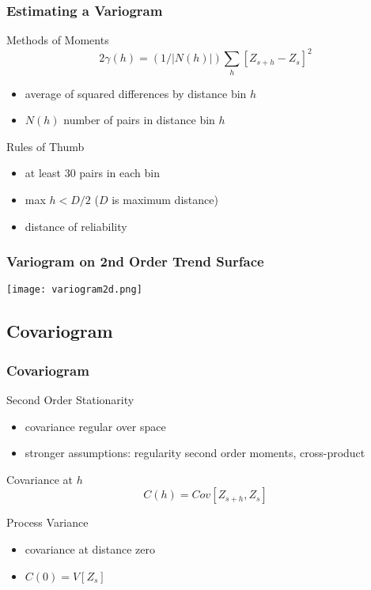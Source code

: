 \documentclass[nototal,handout]{beamer}
\begin{document}
 \begin{frame}
   \frametitle{Estimating a Variogram}
   \begin{block}{Methods of Moments}
     \begin{equation}
       2\gamma(h) = (1 / |N(h)|) \sum_h [Z_{s+h} - Z_s]^2
       \label{}
     \end{equation}
       \begin{itemize}
	 \item average of squared differences by distance bin $h$
	 \item $N(h)$ number of pairs in distance bin $h$
       \end{itemize}
    \end{block}
    \begin{block}{Rules of Thumb}
      \begin{itemize}
	\item at least 30 pairs in each bin
	\item max $h < D/2$ ($D$ is maximum distance)
	\item distance of reliability
      \end{itemize}
    \end{block}
  \end{frame}

\begin{frame}[<+->]
  \frametitle{Variogram on 2nd Order Trend Surface}
    \begin{center}
      \texttt{[image: variogram2d.png]}
    \end{center}
 \end{frame}
 \subsection{Covariogram}
 \begin{frame}
   \frametitle{Covariogram}
   \begin{block}{Second Order Stationarity}
     \begin{itemize}
       \item covariance regular over space
       \item stronger assumptions: regularity second order moments,
	 cross-product
     \end{itemize}
    \end{block}
    \begin{block}{Covariance at $h$}
      \begin{equation}
	C(h) = Cov[Z_{s+h},Z_s]
	\label{}
      \end{equation}
    \end{block}
    \begin{block}{Process Variance}
      \begin{itemize}
	\item covariance at distance zero
	\item $C(0) = V[Z_s]$
      \end{itemize}
    \end{block}

  \end{frame}
\end{document}
